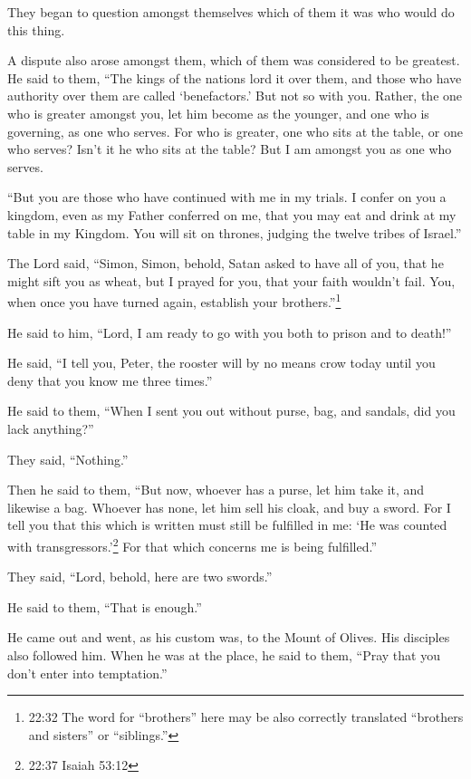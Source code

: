  They began to question amongst themselves which of them it
was who would do this thing.

 A dispute also arose amongst them, which of them was
considered to be greatest.  He said to them, ``The kings of
the nations lord it over them, and those who have authority over them
are called `benefactors.'  But not so with you. Rather, the
one who is greater amongst you, let him become as the younger, and one
who is governing, as one who serves.  For who is greater,
one who sits at the table, or one who serves? Isn't it he who sits at
the table? But I am amongst you as one who serves.

 ``But you are those who have continued with me in my
trials.  I confer on you a kingdom, even as my Father
conferred on me,  that you may eat and drink at my table in
my Kingdom. You will sit on thrones, judging the twelve tribes of
Israel.''

 The Lord said, ``Simon, Simon, behold, Satan asked to have
all of you, that he might sift you as wheat,  but I prayed
for you, that your faith wouldn't fail. You, when once you have turned
again, establish your brothers.''\footnote{22:32 The word for
  ``brothers'' here may be also correctly translated ``brothers and
  sisters'' or ``siblings.''}

 He said to him, ``Lord, I am ready to go with you both to
prison and to death!''

 He said, ``I tell you, Peter, the rooster will by no means
crow today until you deny that you know me three times.''

 He said to them, ``When I sent you out without purse, bag,
and sandals, did you lack anything?''

They said, ``Nothing.''

 Then he said to them, ``But now, whoever has a purse, let
him take it, and likewise a bag. Whoever has none, let him sell his
cloak, and buy a sword.  For I tell you that this which is
written must still be fulfilled in me: `He was counted with
transgressors.'\footnote{22:37 Isaiah 53:12} For that which concerns me
is being fulfilled.''

 They said, ``Lord, behold, here are two swords.''

He said to them, ``That is enough.''

 He came out and went, as his custom was, to the Mount of
Olives. His disciples also followed him.  When he was at
the place, he said to them, ``Pray that you don't enter into
temptation.''

